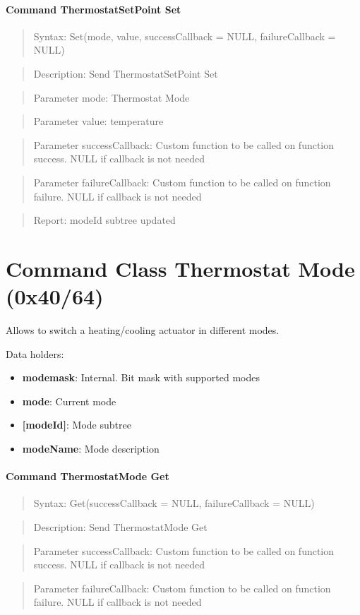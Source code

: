 \paragraph{Command ThermostatSetPoint Set}
\begin{quote}Syntax: Set(mode, value, successCallback = NULL, failureCallback = NULL)\end{quote}
\begin{quote}Description: Send ThermostatSetPoint Set\end{quote}
\begin{quote}Parameter mode: Thermostat Mode\end{quote}
\begin{quote}Parameter value: temperature\end{quote}
\begin{quote}Parameter successCallback: Custom function to be called on function success. NULL if callback is not needed\end{quote}
\begin{quote}Parameter failureCallback: Custom function to be called on function failure. NULL if callback is not needed\end{quote}
\begin{quote}Report: modeId subtree updated\end{quote}


\section{Command Class Thermostat Mode (0x40/64)}

Allows to switch a heating/cooling actuator in different modes.
\newline

\noindent
Data holders:

\begin{itemize}
\item \textbf{modemask}: Internal. Bit mask with supported modes
\item \textbf{mode}: Current mode
\item \textbf{[modeId]}: Mode subtree
\item \qquad\textbf{modeName}: Mode description
\end{itemize}

\paragraph{Command ThermostatMode Get}
\begin{quote}Syntax: Get(successCallback = NULL, failureCallback = NULL)\end{quote}
\begin{quote}Description: Send ThermostatMode Get\end{quote}
\begin{quote}Parameter successCallback: Custom function to be called on function success. NULL if callback is not needed\end{quote}
\begin{quote}Parameter failureCallback: Custom function to be called on function failure. NULL if callback is not needed\end{quote}



